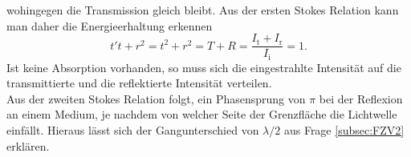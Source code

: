 wohingegen die Transmission gleich bleibt.
Aus der ersten Stokes Relation kann man daher die Energieerhaltung erkennen
\begin{equation}
  t't + r^{2} = t^{2} + r^{2} = T + R = \frac{I_{\text{t}} + I_{\text{r}}}{I_{\text{i}}} = 1.
\end{equation}
Ist keine Absorption vorhanden, so muss sich die eingestrahlte Intensität auf die transmittierte und die reflektierte Intensität
verteilen. \\
Aus der zweiten Stokes Relation folgt, ein Phasensprung von $\pi$
bei der Reflexion an einem Medium, je nachdem von welcher Seite der Grenzfläche die Lichtwelle einfällt.
Hieraus lässt sich der Gangunterschied von $\lambda / 2$ aus Frage \ref{subsec:FZV2} erklären. \\
